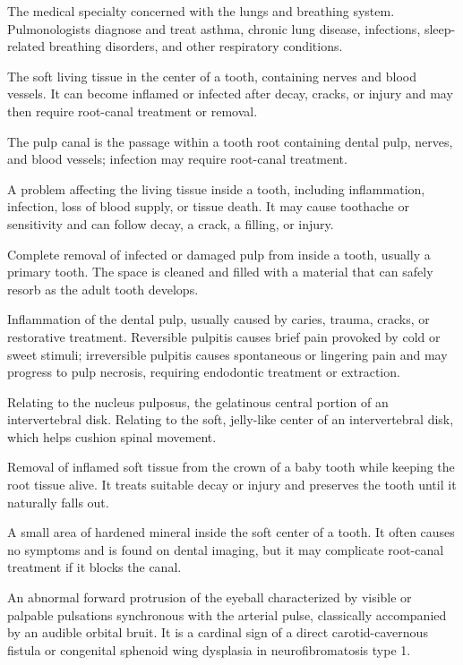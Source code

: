  The medical specialty concerned with the lungs and breathing system. Pulmonologists diagnose and treat asthma, chronic lung disease, infections, sleep-related breathing disorders, and other respiratory conditions.

 The soft living tissue in the center of a tooth, containing nerves and blood vessels. It can become inflamed or infected after decay, cracks, or injury and may then require root-canal treatment or removal.

 The pulp canal is the passage within a tooth root containing dental pulp, nerves, and blood vessels; infection may require root-canal treatment.

 A problem affecting the living tissue inside a tooth, including inflammation, infection, loss of blood supply, or tissue death. It may cause toothache or sensitivity and can follow decay, a crack, a filling, or injury.

 Complete removal of infected or damaged pulp from inside a tooth, usually a primary tooth. The space is cleaned and filled with a material that can safely resorb as the adult tooth develops.

 Inflammation of the dental pulp, usually caused by caries, trauma, cracks, or restorative treatment. Reversible pulpitis causes brief pain provoked by cold or sweet stimuli; irreversible pulpitis causes spontaneous or lingering pain and may progress to pulp necrosis, requiring endodontic treatment or extraction.

 Relating to the nucleus pulposus, the gelatinous central portion of an intervertebral disk. Relating to the soft, jelly-like center of an intervertebral disk, which helps cushion spinal movement.

 Removal of inflamed soft tissue from the crown of a baby tooth while keeping the root tissue alive. It treats suitable decay or injury and preserves the tooth until it naturally falls out.

 A small area of hardened mineral inside the soft center of a tooth. It often causes no symptoms and is found on dental imaging, but it may complicate root-canal treatment if it blocks the canal.

 An abnormal forward protrusion of the eyeball characterized by visible or palpable pulsations synchronous with the arterial pulse, classically accompanied by an audible orbital bruit. It is a cardinal sign of a direct carotid-cavernous fistula or congenital sphenoid wing dysplasia in neurofibromatosis type 1.

